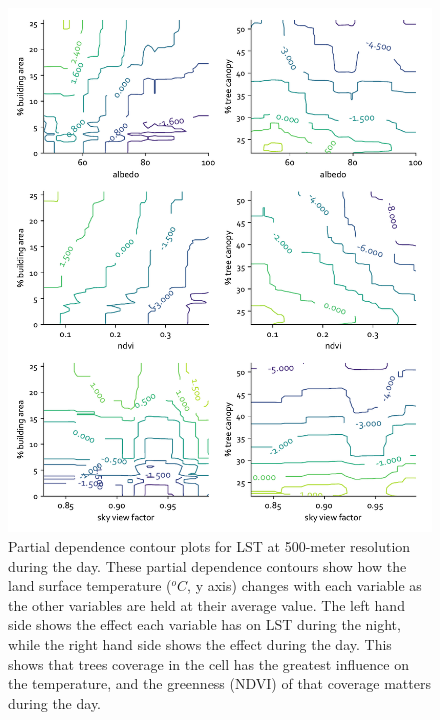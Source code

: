 \documentclass[review]{elsarticle}
\begin{document}
\begin{figure}[h]
    \centering
    \includegraphics[width=\linewidth]{fig/report/pdp_2d_day_500.pdf}
    \caption[Partial dependence contour plots for LST at 500-meter resolution during the day]{
    Partial dependence contour plots for LST at 500-meter resolution during the day.
    These partial dependence contours show how the land surface temperature ($^oC$, y axis) changes with each variable as the other variables are held at their average value. The left hand side shows the effect each variable has on LST during the night, while the right hand side shows the effect during the day. This shows that trees coverage in the cell has the greatest influence on the temperature, and the greenness (NDVI) of that coverage matters during the day.
    }
    \label{fig:pdp_2dday_500}
\end{figure}


\clearpage
\end{document}
